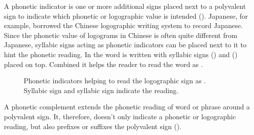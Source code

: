 \documentclass[../main.tex]{subfiles}
\begin{document}
A phonetic indicator is one or more additional signs placed next to a polyvalent sign to
indicate which phonetic or logographic value is intended (\cite[56-57]{whittaker2009}).
Japanese, for example, borrowed the Chinese logographic writing system to record Japanese.
Since the phonetic value of logograms in Chinese is often quite different from Japanese, 
syllabic signs acting as phonetic indicators can be placed next to it to hint the phonetic reading.
In  the word  is written with syllabic signs 
 () and  ()
placed on top.
Combined it helps the reader to read the word as .
\begin{figure}[h!]
    \centering
    \caption[Japanese phonetic indicators]{Phonetic indicators helping to read the 
             logographic sign  as .\\
            Syllabic sign   and 
            syllabic sign   indicate the reading.}
\end{figure}
A phonetic complement extends the phonetic reading of word or phrase around a polyvalent sign.
It, therefore, doesn't only indicate a phonetic or logographic reading, but also prefixes or
suffixes the polyvalent sign (\cite[56-57]{whittaker2009}).
\end{document}
